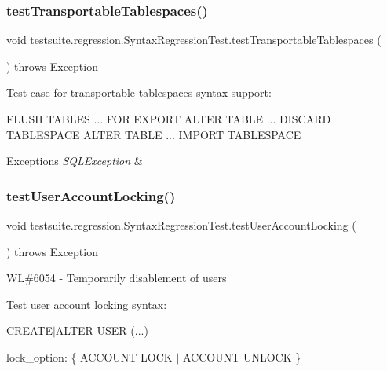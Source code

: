 \subsubsection{\texorpdfstring{test\+Transportable\+Tablespaces()}{testTransportableTablespaces()}}
{\footnotesize\ttfamily void testsuite.\+regression.\+Syntax\+Regression\+Test.\+test\+Transportable\+Tablespaces (\begin{DoxyParamCaption}{ }\end{DoxyParamCaption}) throws Exception}

Test case for transportable tablespaces syntax support\+:

F\+L\+U\+SH T\+A\+B\+L\+ES ... F\+OR E\+X\+P\+O\+RT A\+L\+T\+ER T\+A\+B\+LE ... D\+I\+S\+C\+A\+RD T\+A\+B\+L\+E\+S\+P\+A\+CE A\+L\+T\+ER T\+A\+B\+LE ... I\+M\+P\+O\+RT T\+A\+B\+L\+E\+S\+P\+A\+CE


\begin{DoxyExceptions}{Exceptions}
{\em S\+Q\+L\+Exception} & \\
\hline
\end{DoxyExceptions}
\mbox{\label{classtestsuite_1_1regression_1_1_syntax_regression_test_a3da9a690faaf10c2046b6ba25f7a092a}} 
\subsubsection{\texorpdfstring{test\+User\+Account\+Locking()}{testUserAccountLocking()}}
{\footnotesize\ttfamily void testsuite.\+regression.\+Syntax\+Regression\+Test.\+test\+User\+Account\+Locking (\begin{DoxyParamCaption}{ }\end{DoxyParamCaption}) throws Exception}

WL\#6054 -\/ Temporarily disablement of users

Test user account locking syntax\+:

C\+R\+E\+A\+T\+E$\vert$\+A\+L\+T\+ER U\+S\+ER (...)
\begin{DoxyItemize}
\item lock\+\_\+option\+: \{ A\+C\+C\+O\+U\+NT L\+O\+CK $\vert$ A\+C\+C\+O\+U\+NT U\+N\+L\+O\+CK \} 
\end{DoxyItemize}\mbox{\label{classtestsuite_1_1regression_1_1_syntax_regression_test_a3b24b59ae1c99620e5666390a7b80119}} 
